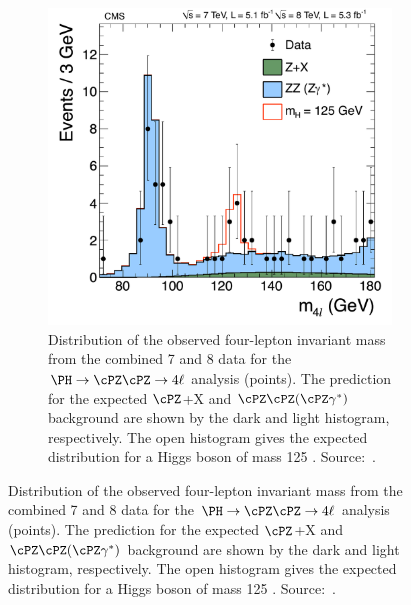 \begin{figure}[htbp]
\begin{subfigure}[htbp]{0.48\textwidth}
    \includegraphics[width=\textwidth]{figures_and_tables/theory/higgs_discovery_hzz4l.pdf}
    \caption{ Distribution of the observed four-lepton invariant mass from the combined 7 and 8 \TeV data 
    for the $\PH \to \cPZ\cPZ\to 4\ell$ analysis (points).
    The prediction for the expected $\cPZ$+X and $\cPZ\cPZ(\cPZ\gamma^*)$ background are shown by the dark and light histogram, respectively. The open histogram gives the expected distribution for a Higgs boson of mass 125 \GeV. Source:~\cite{higgs_discovery_cms}.}
    \label{higgs_discovery_hzz4l}
  \end{subfigure}
\end{figure}











